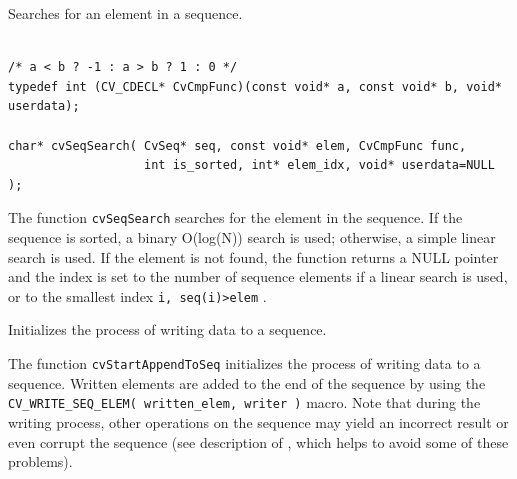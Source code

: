 \label{SeqSearch}

Searches for an element in a sequence.

\begin{lstlisting}

/* a < b ? -1 : a > b ? 1 : 0 */
typedef int (CV_CDECL* CvCmpFunc)(const void* a, const void* b, void* userdata);

char* cvSeqSearch( CvSeq* seq, const void* elem, CvCmpFunc func,
                   int is_sorted, int* elem_idx, void* userdata=NULL );

\end{lstlisting}

\begin{description}
\end{description}

The function \texttt{cvSeqSearch} searches for the element in the sequence. If
the sequence is sorted, a binary O(log(N)) search is used; otherwise, a
simple linear search is used. If the element is not found, the function
returns a NULL pointer and the index is set to the number of sequence
elements if a linear search is used, or to the smallest index
\texttt{i, seq(i)>elem}
.

\label{StartAppendToSeq}

Initializes the process of writing data to a sequence.


\begin{description}
\end{description}

The function \texttt{cvStartAppendToSeq} initializes the process of
writing data to a sequence. Written elements are added to the end of the
sequence by using the
\texttt{CV\_WRITE\_SEQ\_ELEM( written\_elem, writer )}
macro. Note
that during the writing process, other operations on the sequence may
yield an incorrect result or even corrupt the sequence (see description of
, which helps to avoid some of these problems).

